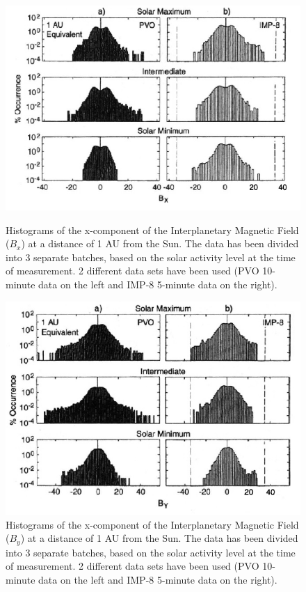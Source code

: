 \documentclass[12pt]{article}
\begin{document}
        \begin{figure}[t!]
            \begin{minipage}{0.48\textwidth}
                \centering
                \includegraphics[width=\textwidth]{fig_introduction/russellBX.png}
                \caption{Histograms of the x-component of the Interplanetary Magnetic Field ($B_x$) at a distance of 1 AU from the Sun\cite{2001russell}. The data has been divided into 3 separate batches, based on the solar activity level at the time of measurement. 2 different data sets have been used (PVO 10-minute data on the left and IMP-8 5-minute data on the right).}
                \label{fig:russellBX}
            \end{minipage}
            \hfill
            \begin{minipage}{0.48\textwidth}
                \centering
                \includegraphics[width=\textwidth]{fig_introduction/russellBY.png}
                \caption{Histograms of the x-component of the Interplanetary Magnetic Field ($B_y$) at a distance of 1 AU from the Sun\cite{2001russell}. The data has been divided into 3 separate batches, based on the solar activity level at the time of measurement. 2 different data sets have been used (PVO 10-minute data on the left and IMP-8 5-minute data on the right).}
                \label{fig:russellBY}
            \end{minipage}
        \end{figure}
\end{document}
